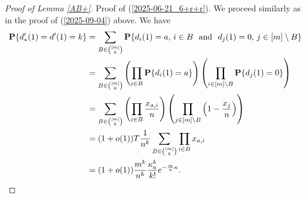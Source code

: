 \documentclass[11pt, a4paper]{article}
\newcommand{\PP}{{\bf{P}}}
\begin{document}
\begin{proof}[ Proof of Lemma \ref{AB+}]
Proof of (\ref{2025-06-21_6+r+r}). We proceed similarly as in the proof of (\ref{2025-09-04})
above. We have
\begin{align*}
\PP\{d'_*(1)=d'(1)=k\}
&
=
\sum_{B\in\binom{[m]}{k}}
\PP\{d_i(1)=a,\, i\in B
\
\
{\text{and}}
\
\
d_j(1)=0,
\, j\in [m]\setminus B\}
\\
\nonumber
&
=
\sum_{B\in\binom{[m]}{k}}
\left(
\prod_{i\in B}
\PP\{d_i(1)=a\}
\right)
\left(
\prod_{i\in[m]\setminus B}
\PP\{d_j(1)=0\}
\right)
\\
\nonumber
&=
\sum_{B\in\binom{[m]}{k}}
\left(
\prod_{i\in B}
\frac{x_{a,i}}{n}
\right)
\left(
\prod_{j\in[m]\setminus B}
\left(
1
-
\frac{x_j}{n}
\right)
\right)
\\
\nonumber
&
=
(1+o(1))
T\frac{1}{n^k}
\sum_{B\in\binom{[m]}{k}}
\prod_{i\in B}x_{a,i}
\\
\nonumber
&
=
 (1+o(1))\frac{m^k}{n^k}\frac{\kappa_a^k}{k!}
 e^{-\frac{m}{n}\kappa}.
\end{align*}


\end{proof}
\end{document}

